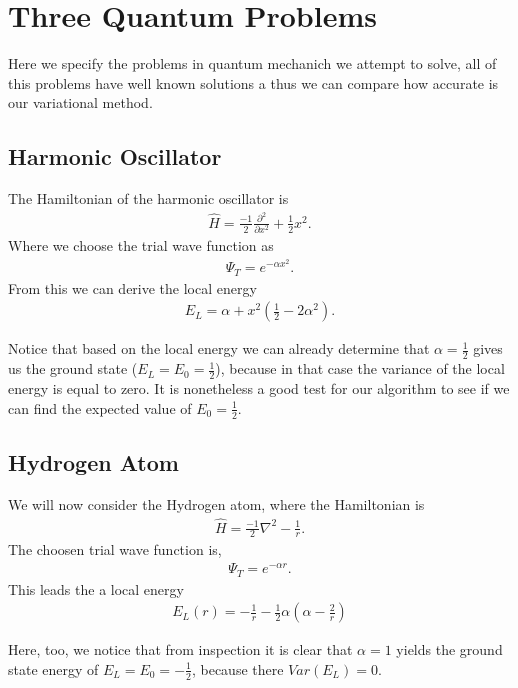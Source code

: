 \section{Three Quantum Problems}
Here we specify the problems in quantum mechanich we attempt to solve,
all of this problems have well known solutions a thus we can compare how accurate is our variational method.

\subsection{Harmonic Oscillator}
The Hamiltonian of the harmonic oscillator is
\begin{align*}
  \hat{H} = \frac{-1}{2}\frac{\partial^2}{ \partial x^2} + \frac{1}{2} x^2.
\end{align*}
Where we choose the trial wave function as
  \begin{align*}
    \Psi_T = e^{-\alpha x^2}.
  \end{align*}
From this we can derive the local energy
  \begin{align*}
    E_L = \alpha + x^2(\frac{1}{2} - 2\alpha^2).
  \end{align*}

Notice that based on the local energy we can already determine
that $\alpha = \frac{1}{2}$ gives us the ground state ($E_L = E_0 = \frac{1}{2}$),
because in that case the variance of the local energy is equal to zero.
It is nonetheless a good test for our algorithm to see if we can find the expected
value of $E_0 = \frac{1}{2}$.



\subsection{Hydrogen Atom}
We will now consider the Hydrogen atom, where the Hamiltonian is
\begin{align*}
  \hat{H} = \frac{-1}{2}\nabla^2 - \frac{1}{r}.
\end{align*}
The choosen trial wave function is,
  \begin{align*}
    \Psi_T = e^{-\alpha r}.
  \end{align*}
This leads the a local energy
  \begin{align*}
    E_L(r) = - \frac{1}{r} - \frac{1}{2}\alpha(\alpha - \frac{2}{r})
  \end{align*}

Here, too, we notice that from inspection it is clear that $\alpha = 1$ yields the ground state energy
 of $E_L = E_0 = -\frac{1}{2}$, because there $Var(E_L) = 0$.



